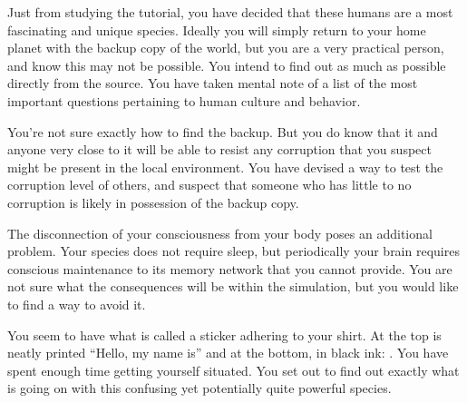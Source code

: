 \documentclass[char]{guildcamp1}
\begin{document}
Just from studying the tutorial, you have decided that these humans are a most fascinating and unique species. Ideally you will simply return to your home planet with the backup copy of the world, but you are a very practical person, and know this may not be possible. You intend to find out as much as possible directly from the source. You have taken mental note of a list of the most important questions pertaining to human culture and behavior.

You're not sure exactly how to find the backup. But you do know that it and anyone very close to it will be able to resist any corruption that you suspect might be present in the local environment. You have devised a way to test the corruption level of others, and suspect that someone who has little to no corruption is likely in possession of the backup copy.

The disconnection of your consciousness from your body poses an additional problem. Your species does not require sleep, but periodically your brain requires conscious maintenance to its memory network that you cannot provide. You are not sure what the consequences will be within the simulation, but you would like to find a way to avoid it.

You seem to have what is called a sticker adhering to your shirt. At the top is neatly printed ``Hello, my name is'' and at the bottom, in black ink: \cPassive{\intro}. You have spent enough time getting yourself situated. You set out to find out exactly what is going on with this confusing yet potentially quite powerful species.

\end{document}

